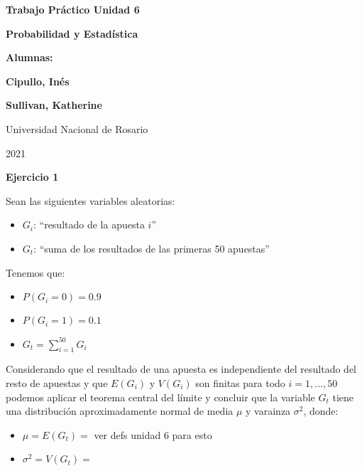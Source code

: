 \documentclass[11pt]{article}
\begin{document}
\begin{titlepage}
    \begin{center}
        \vfill
        \vfill
            \vspace{0.7cm}
            \noindent\textbf{\Huge Trabajo Pr\'actico Unidad 6}\par
            \noindent\textbf{\Huge Probabilidad y Estad\'istica}\par
            \vspace{.5cm}
        \vfill
        \noindent \textbf{\huge Alumnas:}\par
        \vspace{.5cm}
        \noindent \textbf{\Large Cipullo, In\'es}\par
        \noindent \textbf{\Large Sullivan, Katherine}\par
 
        \vfill
        \large Universidad Nacional de Rosario \par
        \noindent\large 2021
    \end{center}
\end{titlepage}
\par


\textbf{Ejercicio 1}

Sean las siguientes variables aleatorias:
\begin{itemize}
    \item $G_i$: ``resultado de la apuesta $i$''
    \item $G_t$: ``suma de los resultados de las primeras 50 apuestas''

\end{itemize}

Tenemos que:
\begin{itemize}
    \item $P(G_i = 0) = 0.9$
    \item $P(G_i = 1) = 0.1$
    \item $G_t = \sum_{i = 1}^{50} G_i$
\end{itemize}

Considerando que el resultado de una apuesta es independiente del resultado del resto de apuestas y que $E(G_i)$ y $V(G_i)$ son finitas 
para todo $i=1,...,50$ podemos aplicar el teorema central del l\'imite y concluir que la variable $G_t$ tiene una distribuci\'on 
aproximadamente normal de media $\mu$ y varainza $\sigma^2$, donde:

\begin{itemize}
    \item $\mu = E(G_t) = $ ver defs unidad 6 para esto
    \item $\sigma^2 = V(G_t) = $
\end{itemize}
\end{document}
